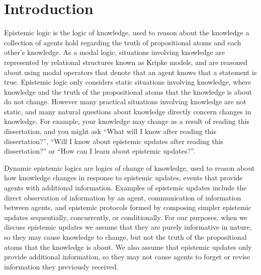 \chapter{Introduction}\label{introduction}

Epistemic logic is the logic of knowledge, used to reason about the knowledge a collection of agents hold regarding the truth of propositional atoms and each other's knowledge.
As a modal logic, situations involving knowledge are represented by relational structures known as Kripke models, and are reasoned about using modal operators that denote that an agent knows that a statement is true.
Epistemic logic only considers static situations involving knowledge, where knowledge and the truth of the propositional atoms that the knowledge is about do not change.
However many practical situations involving knowledge are not static, and many natural questions about knowledge directly concern changes in knowledge.
For example, your knowledge may change as a result of reading this dissertation, and you might ask ``What will I know after reading this dissertation?'', ``Will I know about epistemic updates after reading this dissertation?'' or ``How can I learn about epistemic updates?''.

Dynamic epistemic logics are logics of change of knowledge, used to reason about how knowledge changes in response to epistemic updates, events that provide agents with additional information.
Examples of epistemic updates include the direct observation of information by an agent, communication of information between agents, and epistemic protocols formed by composing simpler epistemic updates sequentially, concurrently, or conditionally.
For our purposes, when we discuss epistemic updates we assume that they are purely informative in nature, so they may cause knowledge to change, but not the truth of the propositional atoms that the knowledge is about.
We also assume that epistemic updates only provide additional information, so they may not cause agents to forget or revise information they previously received.

